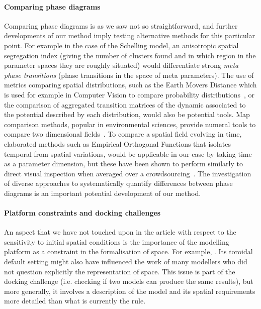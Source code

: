 \documentclass[preprint,5p,times,twocolumn,authoryear]{elsarticle}
\begin{document}
\paragraph{Comparing phase diagrams} Comparing phase diagrams is as we saw not so straightforward, and further developments of our method imply testing alternative methods for this particular point. For example in the case of the Schelling model, an anisotropic spatial segregation index (giving the number of clusters found and in which region in the parameter spaces they are roughly situated) would differentiate strong \emph{meta phase transitions} (phase transitions in the space of meta parameters). The use of metrics comparing spatial distributions, such as the Earth Movers Distance which is used for example in Computer Vision to compare probability distributions~\citep{rubner2000earth}, or the comparison of aggregated transition matrices of the dynamic associated to the potential described by each distribution, would also be potential tools. Map comparison methods, popular in environmental sciences, provide numeral tools to compare two dimensional fields~\citep{visser2006map}. To compare a spatial field evolving in time, elaborated methods such as Empirical Orthogonal Functions that isolates temporal from spatial variations, would be applicable in our case by taking time as a parameter dimension, but these have been shown to perform similarly to direct visual inspection when averaged over a crowdsourcing~\citep{10.1371/journal.pone.0178165}. The investigation of diverse approaches to systematically quantify differences between phase diagrams is an important potential development of our method.



\paragraph{Platform constraints and docking challenges}

An aspect that we have not touched upon in the article with respect to the sensitivity to initial spatial conditions is the importance of the modelling platform as a constraint in the formalisation of space. For example, . Its toroidal default setting might also have influenced the work of many modellers who did not question explicitly the representation of space. This issue is part of the docking challenge \citep{Axtelletal1996} (i.e. checking if two models can produce the same results), but more generally, it involves a description of the model and its spatial requirements more detailed than what is currently the rule.
\end{document}

